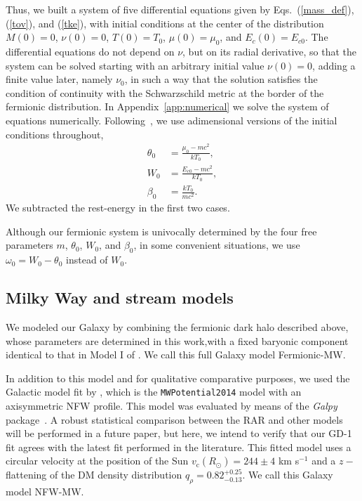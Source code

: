\documentclass[referee]{aa} %
\begin{document}
Thus, we built a system of five differential equations given
by Eqs.~(\ref{mass_def}), (\ref{tov}), and (\ref{tke}), with initial conditions
at the center of the distribution $M(0)=0$, $\nu(0)=0$, $T(0)=T_0$,
$\mu(0)=\mu_0$, and $E_c(0)=E_{c0}$.
The differential equations do not depend on $\nu$, but on its radial
derivative, so that the system can be solved starting with an arbitrary initial value $\nu(0)=0$, adding a finite value later, namely $\nu_0$, in such a way that the solution satisfies the condition of continuity with the Schwarzschild metric at the border of the fermionic distribution. In Appendix~\ref{app:numerical} we solve the system of equations numerically. Following~\cite{arguelles_novel_2018}, we use adimensional versions of the initial conditions throughout,
\begin{align}
    \theta_0 &= \frac{\mu_0 - mc^2}{kT_0},\nonumber\\
    W_0 &= \frac{E_{c0} - mc^2}{kT_0},\nonumber\\
    \beta_0 &= \frac{kT_0}{mc^2}.\label{rar_params}
\end{align}
We subtracted the rest-energy in the first two cases.

Although our fermionic system is univocally determined by the four free parameters $m$, $\theta_0$, $W_0$, and $\beta_0$, in some convenient situations, we use $\omega_0=W_0-\theta_0$ instead of $W_0$.




\subsection{Milky Way and stream models}
\label{sec:MW_stream_models}

We modeled our Galaxy by combining the fermionic dark halo described above, whose parameters are determined in this work,with a fixed baryonic component identical to that in Model I of \citet{2017A&A...598A..66P}. We call this full Galaxy model Fermionic-MW.

In addition to this model and for qualitative comparative purposes, we used the Galactic model fit by \citet{2019MNRAS.486.2995M}, which is the {\texttt{MWPotential2014}} model with an axisymmetric NFW profile. This model was evaluated by means of the {\it Galpy} package~\citep{2015ApJS..216...29B}. A robust statistical comparison between the RAR and other models will be performed in a future paper, but here, we intend to verify that our GD-1 fit agrees with the latest fit performed in the literature. This fitted model uses a circular velocity at the position of the Sun $v_\mathrm{c}(R_\odot)=244 \pm 4$ km s$^{-1}$ and a $z-$flattening of the DM density distribution  $q_\rho=0.82^{+0.25}_{-0.13}$. We call this Galaxy model NFW-MW.
\end{document}
